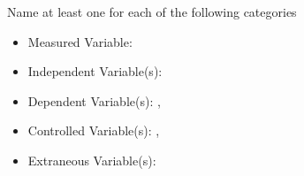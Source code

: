 \documentclass[fleqn]{beamer} %
\begin{document}
\begin{frame}
\begin{multicols}{2}
				Name at least one for each of the following categories 

				\begin{itemize}
				\item Measured Variable: \hspcu \vspc 
				\item Independent Variable(s): \hspcu \vspc
				\item Dependent Variable(s): \hspcu, \hspcu \vspc 
				\item Controlled Variable(s): \hspcu, \hspcu \vspc 
				\item Extraneous Variable(s):\hspcu \vspc
				\end{itemize}

				\end{multicols}	


				

			\end{frame}
\end{document}
